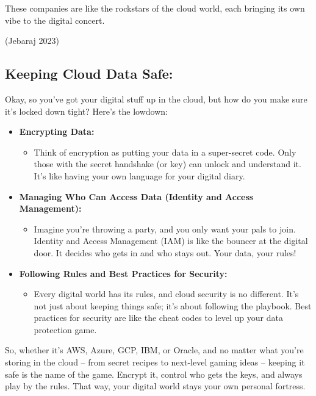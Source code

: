 \documentclass[
  letterpaper,
  DIV=11,
  numbers=noendperiod]{scrreprt}
\providecommand{\tightlist}{%
  \setlength{\itemsep}{0pt}\setlength{\parskip}{0pt}}\usepackage{longtable,booktabs,array}
\begin{document}
These companies are like the rockstars of the cloud world, each bringing
its own vibe to the digital concert.

(Jebaraj 2023)

\subsection{Keeping Cloud Data Safe:}\label{keeping-cloud-data-safe}

Okay, so you've got your digital stuff up in the cloud, but how do you
make sure it's locked down tight? Here's the lowdown:

\begin{itemize}
\item
  \textbf{Encrypting Data:}

  \begin{itemize}
  \tightlist
  \item
    Think of encryption as putting your data in a super-secret code.
    Only those with the secret handshake (or key) can unlock and
    understand it. It's like having your own language for your digital
    diary.
  \end{itemize}
\item
  \textbf{Managing Who Can Access Data (Identity and Access
  Management):}

  \begin{itemize}
  \tightlist
  \item
    Imagine you're throwing a party, and you only want your pals to
    join. Identity and Access Management (IAM) is like the bouncer at
    the digital door. It decides who gets in and who stays out. Your
    data, your rules!
  \end{itemize}
\item
  \textbf{Following Rules and Best Practices for Security:}

  \begin{itemize}
  \tightlist
  \item
    Every digital world has its rules, and cloud security is no
    different. It's not just about keeping things safe; it's about
    following the playbook. Best practices for security are like the
    cheat codes to level up your data protection game.
  \end{itemize}
\end{itemize}

So, whether it's AWS, Azure, GCP, IBM, or Oracle, and no matter what
you're storing in the cloud -- from secret recipes to next-level gaming
ideas -- keeping it safe is the name of the game. Encrypt it, control
who gets the keys, and always play by the rules. That way, your digital
world stays your own personal fortress.
\end{document}
